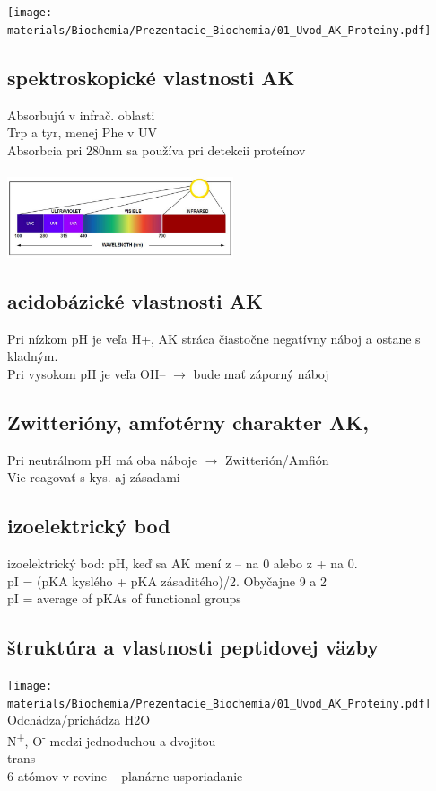 \texttt{[image: materials/Biochemia/Prezentacie\_Biochemia/01\_Uvod\_AK\_Proteiny.pdf]}
\\
\subsection*{spektroskopické vlastnosti AK}
Absorbujú v infrač. oblasti\\
Trp a tyr, menej Phe v UV\\
Absorbcia pri 280nm sa používa pri detekcii proteínov\\
\\
\includegraphics[width=0.5\textwidth]{images/wavelength}
\\
\subsection*{acidobázické vlastnosti AK}
Pri nízkom pH je veľa H+, AK stráca čiastočne negatívny náboj a ostane s kladným. \\
Pri vysokom pH je veľa OH-- $\rightarrow$ bude mať záporný náboj\\
\subsection*{Zwitterióny, amfotérny charakter AK, }
Pri neutrálnom pH má oba náboje $\rightarrow$ Zwitterión/Amfión\\
Vie reagovať s kys. aj zásadami\\
\subsection*{izoelektrický bod}
izoelektrický bod: pH, keď sa AK mení z -- na 0 alebo z + na 0.\\
\tab pI = (pKA kyslého + pKA zásaditého)/2. Obyčajne 9 a 2\\
\tab pI = average of pKAs of functional groups
\subsection*{štruktúra a vlastnosti peptidovej väzby}

\texttt{[image: materials/Biochemia/Prezentacie\_Biochemia/01\_Uvod\_AK\_Proteiny.pdf]}
\\
Odchádza/prichádza H2O\\
N\textsuperscript{+}, O\textsuperscript{-}
medzi jednoduchou a dvojitou\\
trans\\
6 atómov v rovine -- planárne usporiadanie

